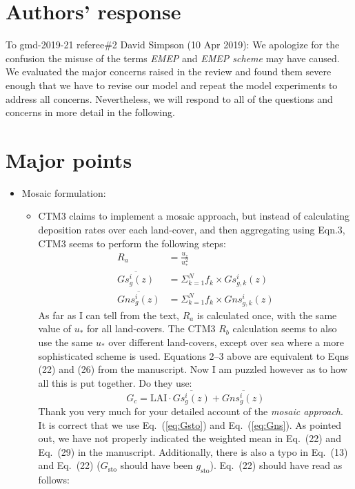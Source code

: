 \documentclass{scrartcl}
\begin{document}
\section*{Authors' response}
To gmd-2019-21 referee\#2 David Simpson (10 Apr 2019):
We apologize for the confusion the misuse of the terms \emph{EMEP} and \emph{EMEP scheme} may have caused. We evaluated the major concerns raised in the review and found them severe enough that we have to revise our model and repeat the model experiments to address all concerns. Nevertheless, we will respond to all of the questions and concerns in more detail in the following.

\section{Major points}
\begin{itemize}
\item {\color{blue} Mosaic formulation:}
  \begin{itemize}
  \item {\color{blue} CTM3 claims to implement a mosaic approach, but instead of calculating deposition
rates over each land-cover, and then aggregating using Eqn.3, CTM3 seems to perform the following steps:
\begin{align}
  \label{eq:ra}
  R_a &= \frac{u_z}{u^2_*}\\
  \label{eq:Gsto}
  \overline{Gs^i_g(z)} &= \Sigma^N_{k=1} f_k \times Gs^i_{g,k}(z)\\
  \label{eq:Gns}
  \overline{Gns^i_g(z)} &= \Sigma^N_{k=1} f_k \times Gns^i_{g,k}(z)
\end{align}
As far as I can tell from the text, $R_a$ is calculated once, with the same value of $u_*$ for all land-covers. The CTM3 $R_b$ calculation seems to also use the same $u_*$ over different land-covers, except over sea where a more sophisticated scheme is used. Equations 2--3 above are equivalent to Eqns (22) and (26) from the manuscript. Now I am puzzled however as to how all this is put together. Do they use:
\begin{equation}
  G_c = \mathrm{LAI} \cdot \overline{Gs^i_g(z)} + \overline{Gns^i_g(z)}
\end{equation}
  }
    Thank you very much for your detailed account of the \emph{mosaic approach}. It is correct that we use Eq.~(\ref{eq:Gsto}) and Eq.~(\ref{eq:Gns}). As pointed out, we have not properly indicated the weighted mean in Eq.~(22) and Eq.~(29) in the manuscript. Additionally, there is also a typo in Eq.~(13) and Eq.~(22) ($G_\mathrm{sto}$ should have been $g_\mathrm{sto}$). Eq.~(22) should have read as follows:

\end{itemize}
\end{itemize}
\end{document}
